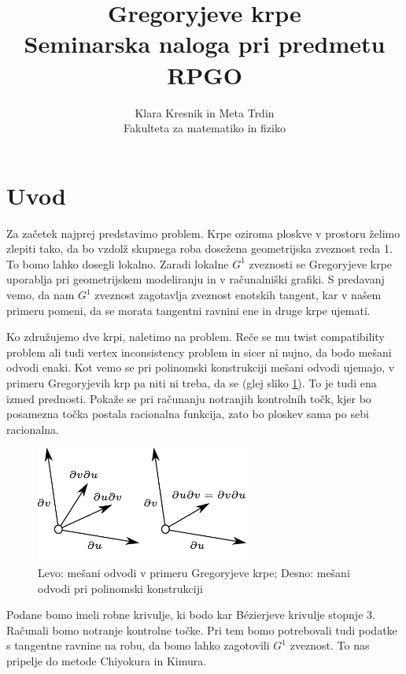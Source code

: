 \documentclass[a4paper,regno]{article}
\title{Gregoryjeve krpe\\
\Large Seminarska naloga pri predmetu RPGO}
\date{}
\author{Klara Kresnik in Meta Trdin\\
Fakulteta za matematiko in fiziko\\
}
\begin{document}
\maketitle



\section{Uvod}
Za začetek najprej predstavimo problem. Krpe oziroma ploskve v prostoru želimo zlepiti tako, da bo vzdolž skupnega roba dosežena geometrijska zveznost reda 1. To bomo lahko dosegli lokalno. Zaradi lokalne $G^1$ zveznosti se Gregoryjeve krpe uporablja pri geometrijskem modeliranju in v računalniški grafiki. S predavanj vemo, da nam $G^1$ zveznost zagotavlja zveznost enotskih tangent, kar v našem primeru pomeni, da se morata tangentni ravnini ene in druge krpe ujemati.

Ko združujemo dve krpi, naletimo na problem. Reče se mu twist compatibility problem ali tudi vertex inconsistency problem in sicer ni nujno, da bodo mešani odvodi enaki.
Kot vemo se pri polinomski konstrukciji mešani odvodi ujemajo, v primeru Gregoryjevih krp pa niti ni treba, da se (glej sliko \ref{fig:mesani odvodi}). To je tudi ena izmed prednosti. Pokaže se pri računanju notranjih kontrolnih točk, kjer bo posamezna točka postala racionalna funkcija, zato bo ploskev sama po sebi racionalna.

\begin{figure}[h]
	\centering
	\includegraphics[width=7cm]{mesani_odvodi_ob.jpg}
	\caption{Levo: mešani odvodi v primeru Gregoryjeve krpe; Desno: mešani odvodi pri polinomski konstrukciji}
	\label{fig:mesani odvodi}
\end{figure}

Podane bomo imeli robne krivulje, ki bodo kar Bézierjeve krivulje stopnje $3$. Računali 
bomo notranje kontrolne točke. Pri tem bomo potrebovali tudi podatke s tangentne ravnine 
na robu, da bomo lahko zagotovili $G^1$ zveznost. To nas pripelje do metode Chiyokura in 
Kimura. 
\end{document}
